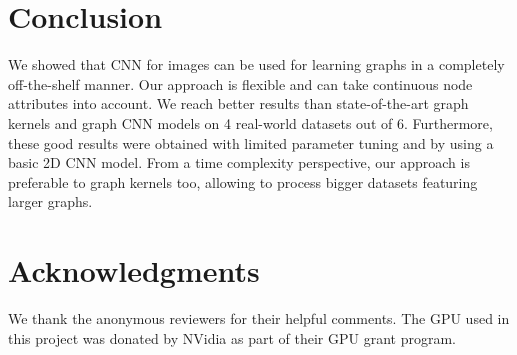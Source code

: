 \documentclass[runningheads]{llncs}
\begin{document}
\vspace{-0.25cm}

\section{Conclusion}
We showed that CNN for images can be used for learning graphs in a completely off-the-shelf manner. Our approach is flexible and can take continuous node attributes into account. We reach better results than state-of-the-art graph kernels and graph CNN models on 4 real-world datasets out of 6. Furthermore, these good results were obtained with limited parameter tuning and by using a basic 2D CNN model. From a time complexity perspective, our approach is preferable to graph kernels too, allowing to process bigger datasets featuring larger graphs.

\section{Acknowledgments}
We thank the anonymous reviewers for their helpful comments. The GPU used in this project was donated by NVidia as part of their GPU grant program.



\end{document}

